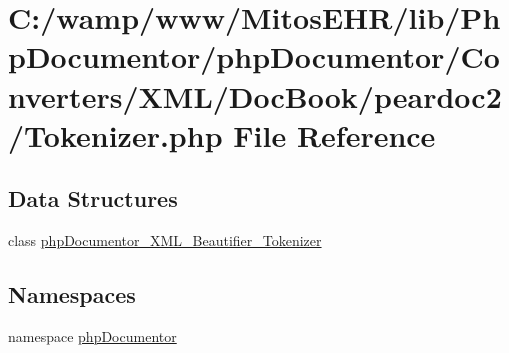 \hypertarget{_tokenizer_8php}{\section{\-C\-:/wamp/www/\-Mitos\-E\-H\-R/lib/\-Php\-Documentor/php\-Documentor/\-Converters/\-X\-M\-L/\-Doc\-Book/peardoc2/\-Tokenizer.php \-File \-Reference}
\label{_tokenizer_8php}
}
\subsection*{\-Data \-Structures}
\begin{DoxyCompactItemize}
\item 
class \hyperlink{classphp_documentor___x_m_l___beautifier___tokenizer}{php\-Documentor\-\_\-\-X\-M\-L\-\_\-\-Beautifier\-\_\-\-Tokenizer}
\end{DoxyCompactItemize}
\subsection*{\-Namespaces}
\begin{DoxyCompactItemize}
\item 
namespace \hyperlink{namespacephp_documentor}{php\-Documentor}
\end{DoxyCompactItemize}
